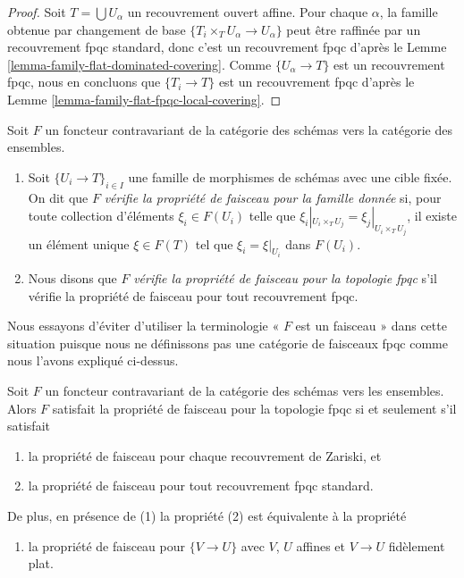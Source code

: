 \begin{proof}
Soit $T = \bigcup U_\alpha$ un recouvrement ouvert affine. Pour chaque $\alpha$, la famille obtenue par changement de base $\{T_i \times_T U_\alpha \to U_\alpha\}$ peut être raffinée par un recouvrement fpqc standard, donc c'est un recouvrement fpqc d'après le Lemme \ref{lemma-family-flat-dominated-covering}. Comme $\{U_\alpha \to T\}$ est un recouvrement fpqc, nous en concluons que $\{T_i \to T\}$ est un recouvrement fpqc d'après le Lemme \ref{lemma-family-flat-fpqc-local-covering}.
\end{proof}

\begin{definition}
\label{definition-sheaf-property-fpqc}
Soit $F$ un foncteur contravariant de la catégorie des schémas vers la catégorie des ensembles.
\begin{enumerate}
\item Soit $\{U_i \to T\}_{i \in I}$ une famille de morphismes de schémas avec une cible fixée. On dit que $F$ {\it vérifie la propriété de faisceau pour la famille donnée} si, pour toute collection d'éléments $\xi_i \in F(U_i)$ telle que $\xi_i|_{U_i \times_T U_j} = \xi_j|_{U_i \times_T U_j}$, il existe un élément unique $\xi \in F(T)$ tel que $\xi_i = \xi|_{U_i}$ dans $F(U_i)$.
\item Nous disons que $F$ {\it vérifie la propriété de faisceau pour la topologie fpqc} s'il vérifie la propriété de faisceau pour tout recouvrement fpqc.
\end{enumerate}
\end{definition}

\noindent
Nous essayons d'éviter d'utiliser la terminologie « $F$ est un faisceau » dans cette situation puisque nous ne définissons pas une catégorie de faisceaux fpqc comme nous l'avons expliqué ci-dessus.

\begin{lemma}
\label{lemma-sheaf-property-fpqc}
Soit $F$ un foncteur contravariant de la catégorie des schémas vers les ensembles. Alors $F$ satisfait la propriété de faisceau pour la topologie fpqc si et seulement s'il satisfait
\begin{enumerate}
\item la propriété de faisceau pour chaque recouvrement de Zariski, et
\item la propriété de faisceau pour tout recouvrement fpqc standard.
\end{enumerate}
De plus, en présence de (1) la propriété (2) est équivalente à la propriété
\begin{enumerate}
\item[(2')] la propriété de faisceau pour $\{V \to U\}$ avec $V$, $U$ affines et $V \to U$ fidèlement plat.
\end{enumerate}
\end{lemma}

